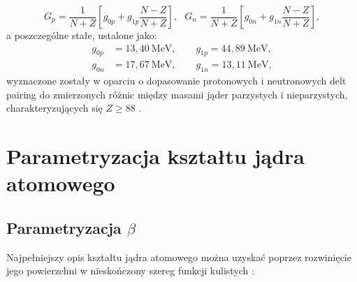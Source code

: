 \documentclass[a4paper,polish]{article}
\numberwithin{equation}{section}
\begin{document}
\begin{equation}
G_p=\frac{1}{N+Z} \left [ g_{0p} + g_{1p} \frac{N-Z}{N+Z} \right ],  ~~~G_n=\frac{1}{N+Z} \left [ g_{0n} + g_{1n} \frac{N-Z}{N+Z} \right ],
\end{equation}
a poszczególne stałe, ustalone jako:
\begin{align*}
g_{0p}&=13,40~\mathrm{MeV}, \qquad g_{1p}=44,89~\mathrm{MeV}, \\
g_{0n}&=17,67~\mathrm{MeV}, \qquad g_{1n}=13,11~\mathrm{MeV},
\end{align*}
wyznaczone zostały w oparciu o dopasowanie protonowych i neutronowych delt pairing do zmierzonych różnic między masami jąder parzystych i nieparzystych, charakteryzujących się $Z \ge 88$ \cite{Muntian}.

\clearpage
\section{Parametryzacja kształtu jądra atomowego}

\subsection{Parametryzacja $\beta$}

Najpełniejszy opis kształtu jądra atomowego można uzyskać poprzez rozwinięcie jego powierzchni w nieskończony szereg funkcji kulistych \cite{Pomorski} :
\end{document}
